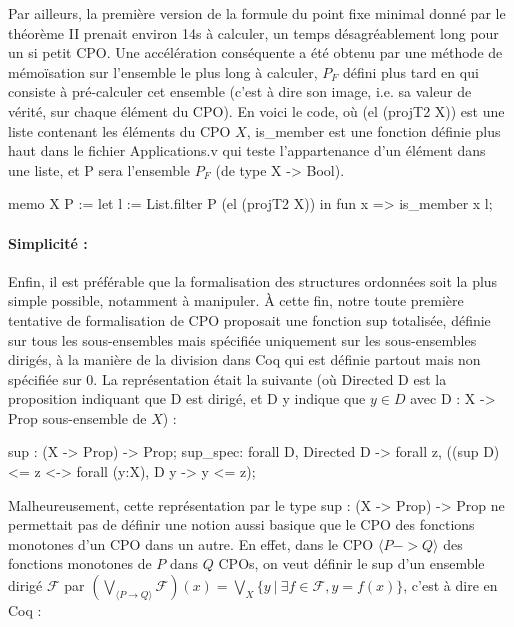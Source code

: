 \documentclass{article}
\newcommand\code[1]{{\fontfamily{lmtt}\selectfont #1}}
\theoremstyle{definition}
\begin{document}
Par ailleurs, la première version de la formule du point fixe minimal donné par le théorème II prenait environ 14s à calculer, un temps désagréablement long pour un si petit CPO. Une accélération conséquente a été obtenu par une méthode de mémoïsation sur l'ensemble le plus long à calculer, $P_F$ défini plus tard en %
qui consiste à pré-calculer cet ensemble (c'est à dire son image, i.e. sa valeur de vérité, sur chaque élément du CPO). En voici le code, où \code{(el (projT2 X))} est une liste contenant les éléments du CPO $X$, \code{is\_member} est une fonction définie plus haut dans le fichier \code{Applications.v} qui teste l'appartenance d'un élément dans une liste, et \code{P} sera l'ensemble $P_F$ (de type \code{X -> Bool}).

\begin{coq}
	memo X P := let l := List.filter P (el (projT2 X)) in
					fun x => is_member x l;
\end{coq}

\paragraph{Simplicité : \\}

Enfin, il est préférable que la formalisation des structures ordonnées soit la plus simple possible, notamment à manipuler. À cette fin, notre toute première tentative de formalisation de CPO proposait une fonction sup totalisée, définie sur tous les sous-ensembles mais spécifiée uniquement sur les sous-ensembles dirigés, à la manière de la division dans Coq qui est définie partout mais non spécifiée sur $0$. La représentation était la suivante (où \code{Directed D} est la proposition indiquant que D est dirigé, et \code{D y} indique que $y \in D$ avec \code{D : X -> Prop} sous-ensemble de $X$) :

\begin{coq}
sup : (X -> Prop) -> Prop;
sup_spec: forall D, Directed D -> forall z, 
			 ((sup D) <= z <-> forall (y:X), D y -> y <= z);
\end{coq}

Malheureusement, cette représentation par le type \code{sup : (X -> Prop) -> Prop} ne permettait pas de définir une notion aussi basique que le CPO des fonctions monotones d'un CPO dans un autre. En effet, dans le CPO $\langle P -> Q \rangle$ des fonctions monotones de $P$ dans $Q$ CPOs, on veut définir le sup d'un ensemble dirigé $\mathcal{F}$ par $(\bigvee_{\langle P \rightarrow Q \rangle} \mathcal{F})(x) = \bigvee_{X} \{y ~ | ~ \exists f \in \mathcal{F}, y = f(x)\}$, c'est à dire en Coq :
\end{document}
